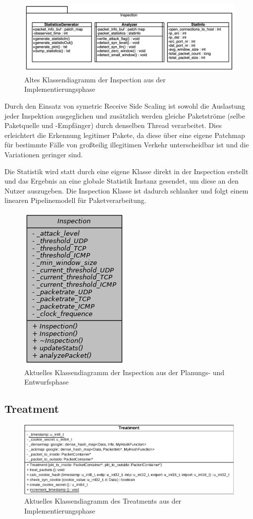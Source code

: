\documentclass[../review_2.tex]{subfiles}
\begin{document}
\begin{figure}[h]
    \centering
    \includegraphics[width=.6\linewidth]{img/Inspection_old.png}
    \caption{Altes Klassendiagramm der Inspection aus der Implementierungsphase}
    \label{InspectionOld}
\end{figure}

Durch den Einsatz von symetric Receive Side Scaling ist sowohl die Auslastung jeder Inspektion ausgeglichen und zusätzlich werden gleiche Paketströme (selbe Paketquelle und -Empfänger) durch denselben Thread verarbeitet. Dies erleichtert die Erkennung legitimer Pakete, da diese über eine eigene Patchmap für bestimmte Fälle von großteilig illegitimen Verkehr unterscheidbar ist und die Variationen geringer sind.

Die Statistik wird statt durch eine eigene Klasse direkt in der Inspection erstellt und das Ergebnis an eine globale Statistik Instanz gesendet, um diese an den Nutzer auszugeben. Die Inspection Klasse ist dadurch schlanker und folgt einem linearen Pipelinemodell für Paketverarbeitung.

\begin{figure}[h]
    \centering
    \includegraphics[width=.2\linewidth]{img/Inspection_new.png}
    \caption{Aktuelles Klassendiagramm der Inspection aus der Planungs- und Entwurfsphase}
    \label{AnalyzerNew}
\end{figure}



\subsection{Treatment}

\begin{figure}[h]
    \centering
    \includegraphics[width=\linewidth]{img/classdia_treatment.pdf}
    \caption{Aktuelles Klassendiagramm des Treatments aus der Implementierungsphase}
    \label{Treatmentclassdia}
\end{figure}
\end{document}
